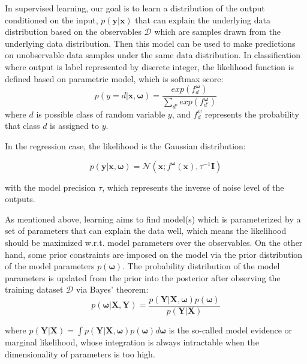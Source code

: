In supervised learning, our goal is to learn a distribution of the output conditioned on the input, $p(\mathbf{y}|\mathbf{x})$ that can explain the underlying data distribution based on the observables $\mathcal{D}$ which are samples drawn from the underlying data distribution. Then this model can be used to make predictions on unobservable data samples under the same data distribution. In classification where output is label represented by discrete integer, the likelihood function is defined based on parametric model, which is softmax score:
\begin{equation}
p(y = d|\mathbf{x}, \boldsymbol{\omega}) = \frac{exp(f^{\boldsymbol{\omega}}_{d})}{\sum_{d'}exp(f^{\boldsymbol{\omega}}_{d'})}  \label{2.1}
\end{equation}
where $d$ is possible class of random variable $y$, and $f^w_d$ represents the probability that class $d$ is assigned to $y$.  

In the regression case, the likelihood is the Gaussian distribution:

\begin{equation}
p(\mathbf{y}|\mathbf{x}, \boldsymbol{\omega}) = \mathcal{N}(\mathbf{x}; f^{\boldsymbol{\omega}}(\mathbf{x}), \tau^{-1}\textbf{I}) 
\label{2.2}
\end{equation}

with the model precision $\tau$, which represents the inverse of noise level of the outputs.

As mentioned above, learning aims to find model(s) which is parameterized by a set of parameters that can explain the data well, which means the likelihood should be maximized w.r.t. model parameters over the observables. On the other hand, some prior constraints are imposed on the model via the prior distribution of the model parameters $p(\boldsymbol{\omega})$. The probability distribution of the model parameters is updated from the prior into the posterior after observing the training dataset $\mathcal{D}$ via Bayes' theorem:
\begin{equation}
p(\boldsymbol{\omega}|\mathbf{X}, \mathbf{Y}) = \frac{p(\mathbf{Y}|\mathbf{X}, \boldsymbol{\omega})p(\boldsymbol{\omega})}{p(\mathbf{Y}|\mathbf{X})}
\label{2.3}
\end{equation}

where $p(\mathbf{Y}| \mathbf{X}) = \int p(\mathbf{Y}| \mathbf{X}, \boldsymbol{\omega})p(\boldsymbol{\omega})d\boldsymbol{\omega}$ is the so-called model evidence or marginal likelihood, whose integration is always intractable when the dimensionality of parameters is too high.


